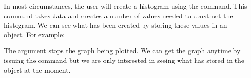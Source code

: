 In most circumstances, the user will create a histogram using the  command. This command takes data and creates a number of values needed to construct the histogram. We can see what has been created by storing these values in an object. For example: 
\begin{knitrout}
\color{fgcolor}\begin{kframe}
\begin{alltt}
\hlstd{> } \hlkwb{=} \hlopt{$} \hlstd{=}\hlstd{,} \hlstd{=}\hlstd{,} \hlstd{=}\hlstd{)}
\end{alltt}


{\ttfamily\noindent{}}\end{kframe}
\end{knitrout}
The  argument stops the graph being plotted. We can get the graph anytime by issuing the  command but we are only interested in seeing what \R{} has stored in the  object at the moment.  
